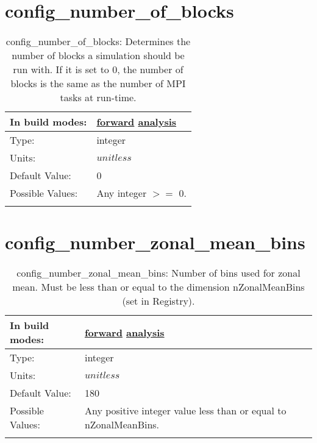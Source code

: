 \section[config\_number\_of\_blocks]{config\_number\_of\_blocks}
\label{sec:nm_sec_config_number_of_blocks}
\begin{center}
\begin{longtable}{| p{2.0in} || p{4.0in} |}
    \hline
    In build modes: & \hyperref[subsec:forward_nm_tab_decomposition]{forward} \hyperref[subsec:analysis_nm_tab_decomposition]{analysis} \\
    \hline
    Type: & integer \\
    \hline
    Units: & $unitless$ \\
    \hline
    Default Value: & 0 \\
    \hline
    Possible Values: & Any integer $>=$ 0. \\
    \hline
    \caption{config\_number\_of\_blocks: Determines the number of blocks a simulation should be run with. If it is set to 0, the number of blocks is the same as the number of MPI tasks at run-time.}
\end{longtable}
\end{center}
\section[config\_number\_zonal\_mean\_bins]{config\_number\_zonal\_mean\_bins}
\label{sec:nm_sec_config_number_zonal_mean_bins}
\begin{center}
\begin{longtable}{| p{2.0in} || p{4.0in} |}
    \hline
    In build modes: & \hyperref[subsec:forward_nm_tab_zonal_mean]{forward} \hyperref[subsec:analysis_nm_tab_zonal_mean]{analysis} \\
    \hline
    Type: & integer \\
    \hline
    Units: & $unitless$ \\
    \hline
    Default Value: & 180 \\
    \hline
    Possible Values: & Any positive integer value less than or equal to nZonalMeanBins. \\
    \hline
    \caption{config\_number\_zonal\_mean\_bins: Number of bins used for zonal mean.  Must be less than or equal to the dimension nZonalMeanBins (set in Registry).}
\end{longtable}
\end{center}
